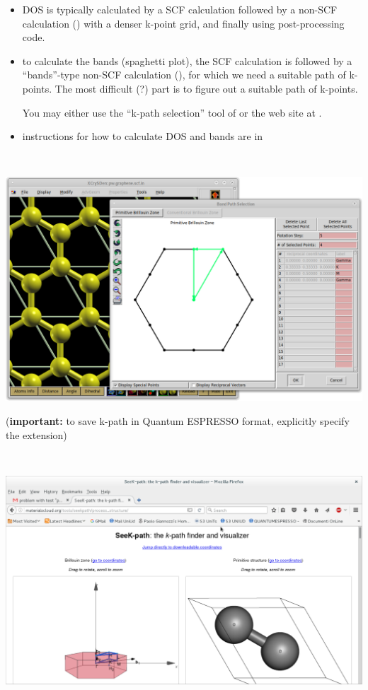 \documentclass[landscape]{foils}
\begin{document}


\begin{itemize}
\item DOS is typically calculated by a  SCF calculation
  followed by a  non-SCF calculation () with a denser k-point grid, and finally using
   post-processing code.

\item to calculate the bands (spaghetti plot), the  SCF
  calculation is followed by a  ``bands''-type non-SCF
  calculation (), for which we need a
  suitable path of k-points. The most difficult (?) part is to figure
  out a suitable path of k-points.

  You may either use the ``k-path selection'' tool of 
  or the  web site at
  .

\item instructions for how to calculate DOS and bands are in 
\end{itemize}

~\\[-1.5em]
\centerline{\includegraphics[width=25cm]{figs/xc-k-path.png}}
{\small ({\bf important:} to save k-path in Quantum ESPRESSO format, explicitly
specify the  extension)}

~\\
\centerline{\includegraphics[width=24cm]{figs/seekpath.pdf}}
\end{document}

